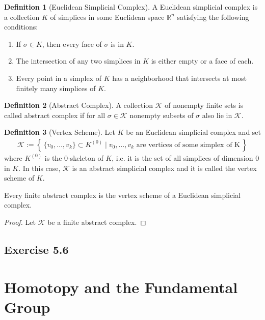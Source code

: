 \documentclass[a4paper]{book}
\theoremstyle{definition}
\newtheorem{definition}{Definition}[]
\newcommand{\makeset}[2]{\left\{\, #1 \mid #2 \,\right\}}
\begin{document}
\begin{defbox}
    \begin{definition}[Euclidean Simplicial Complex]
        A Euclidean simplicial complex is a collection \(K\) of simplices in some Euclidean space \(\mathbb{R}^n\) satisfying the following conditions:
        \begin{enumerate}
            \item If \(\sigma \in K\), then every face of \(\sigma\) is in \(K\).
            \item The intersection of any two simplices in \(K\) is either empty or a face of each.
            \item Every point in a simplex of \(K\) has a neighborhood that intersects at most finitely many simplices of \(K\).
        \end{enumerate}
    \end{definition}
\end{defbox}

\begin{defbox}
    \begin{definition}[Abstract Complex]
        A collection \(\mathcal{K}\) of nonempty finite sets is called abstract complex if for all \(\sigma \in \mathcal{K}\) nonempty subsets of \(\sigma\) also lie in \(\mathcal{K}\).
    \end{definition}
\end{defbox}

\begin{defbox}
    \begin{definition}[Vertex Scheme]
        Let \(K\) be an Euclidean simplicial complex and set
        \begin{align*}
            \mathcal{K} := \makeset{\{v_0, \ldots, v_k\} \subset K^{(0)}}{v_0, \ldots, v_k \text{ are vertices of some simplex of K}}
        \end{align*}
        where \(K^{(0)}\) is the \(0\)-skeleton of \(K\), i.e. it is the set of all simplices of dimension \(0\) in \(K\). In this case, \(\mathcal{K}\) is an abstract simplicial complex and it is called the vertex scheme of \(K\).
    \end{definition}
\end{defbox}

Every finite abstract complex is the vertex scheme of a Euclidean simplicial complex.

\begin{proof}
    Let \(\mathcal{K}\) be a finite abstract complex.
\end{proof}

\section*{Exercise 5.6}


\chapter{Homotopy and the Fundamental Group}
\end{document}
